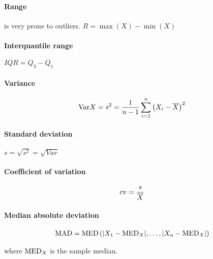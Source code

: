 \paragraph{Range} is very prone to outliers.
$ R = \max(X) - \min(X) $

\paragraph{Interquantile range}
$ IQR = Q_3 - Q_1 $

\paragraph{Variance} \hspace{0pt}

\vspace{-30pt}
\begin{gather*}
\textrm{Var} X = s^2 = \frac{1}{n-1}\sum_{i=1}^n \left( X_i - \overline{X} \right)^2
\end{gather*}

\paragraph{Standard deviation}
$s = \sqrt{s^2} = \sqrt{Var}$

\paragraph{Coefficient of variation} \hspace{0pt}

\vspace{-20pt}
\begin{gather*}
cv = \frac{s}{\overline{X}}
\end{gather*}

\paragraph{Median absolute deviation} \hspace{0pt}

\vspace{-20pt}
\begin{gather*}
\textrm{MAD} = \textrm{MED} \left( |X_1 - \textrm{MED}_X|, \ldots, |X_n - \textrm{MED}_X| \right)
\end{gather*}

\vspace{-10pt} %
where $\textrm{MED}_X$ is the sample median.
